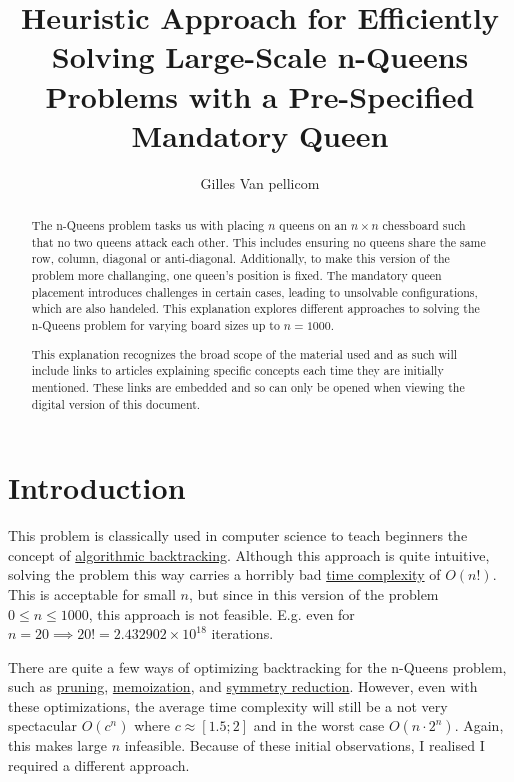 \documentclass{article}
\title{Heuristic Approach for Efficiently Solving Large-Scale n-Queens Problems with a Pre-Specified Mandatory Queen}
\author{Gilles Van pellicom}
\begin{document}
\maketitle

\begin{abstract}
    \setlength{\parindent}{0pt}
    \setlength{\parskip}{1em}
    The n-Queens problem tasks us with placing \(n\) queens on an \(n \times n\) chessboard such that no two queens attack each other.
    This includes ensuring no queens share the same row, column, diagonal or anti-diagonal. Additionally, to make this version of the problem more challanging,
    one queen's position is fixed.
    The mandatory queen placement introduces challenges in certain cases, leading to unsolvable configurations, which are also handeled.
    This explanation explores different approaches to solving the n-Queens problem for varying board sizes up to \(n = 1000\).

    This explanation recognizes the broad scope of the material used and as such will include links to articles explaining specific concepts
    each time they are initially mentioned. These links are embedded and so can only be opened when viewing the digital version of this document.
\end{abstract}

\section{Introduction}
This problem is classically used in computer science to teach beginners the concept of \href{https://en.wikipedia.org/wiki/Backtracking}{algorithmic backtracking}.
Although this approach is quite intuitive, solving the problem this way carries a horribly bad \href{https://en.wikipedia.org/wiki/Time_complexity}{time complexity} of \(O(n!)\).
This is acceptable for small \(n\), but since in this version of the problem \(0 \leq n \leq 1000\), this approach is not feasible.
E.g. even for \(n = 20 \implies 20! = 2.432902 \times 10^{18}\) iterations.

There are quite a few ways of optimizing backtracking for the n-Queens problem, such as \href{https://en.wikipedia.org/wiki/Decision_tree_pruning}{pruning},
\href{https://en.wikipedia.org/wiki/Memoization}{memoization}, and \href{https://www.khoury.northeastern.edu/home/wahl/Publications/ew05b.pdf}{symmetry reduction}.
However, even with these optimizations, the average time complexity will still be a not very spectacular \(O(c^n)\) where \(c \approx [1.5; 2]\) and in the worst case
\(O(n \cdot 2^n)\). Again, this makes large \(n\) infeasible.
Because of these initial observations, I realised I required a different approach.
\end{document}
